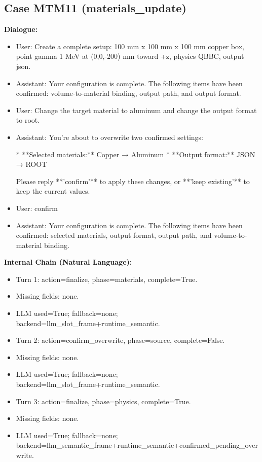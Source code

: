 \documentclass[11pt]{ctexart}
\begin{document}
\subsection{Case MTM11 (materials\_update)}
\textbf{Dialogue:}
\begin{itemize}
\item User: Create a complete setup: 100 mm x 100 mm x 100 mm copper box, point gamma 1 MeV at (0,0,-200) mm toward +z, physics QBBC, output json.
\item Assistant: Your configuration is complete. The following items have been confirmed: volume-to-material binding, output path, and output format.
\item User: Change the target material to aluminum and change the output format to root.
\item Assistant: You're about to overwrite two confirmed settings:

*   **Selected materials:** Copper → Aluminum
*   **Output format:** JSON → ROOT

Please reply **'confirm'** to apply these changes, or **'keep existing'** to keep the current values.
\item User: confirm
\item Assistant: Your configuration is complete. The following items have been confirmed: selected materials, output format, output path, and volume-to-material binding.
\end{itemize}
\textbf{Internal Chain (Natural Language):}
\begin{itemize}
\item Turn 1: action=finalize, phase=materials, complete=True.
\item Missing fields: none.
\item LLM used=True; fallback=none; backend=llm\_slot\_frame+runtime\_semantic.
\item Turn 2: action=confirm\_overwrite, phase=source, complete=False.
\item Missing fields: none.
\item LLM used=True; fallback=none; backend=llm\_slot\_frame+runtime\_semantic.
\item Turn 3: action=finalize, phase=physics, complete=True.
\item Missing fields: none.
\item LLM used=True; fallback=none; backend=llm\_semantic\_frame+runtime\_semantic+confirmed\_pending\_overwrite.
\end{itemize}
\end{document}
